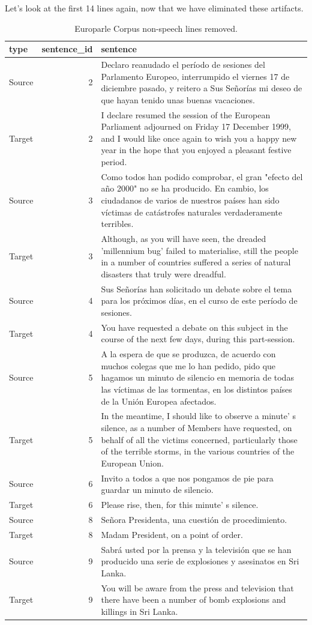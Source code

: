 \documentclass[
]{article}
\begin{document}
Let's look at the first 14 lines again, now that we have eliminated these artifacts.

\begin{table}

\caption{\label{tab:td-europarle-preview-2}Europarle Corpus non-speech lines removed.}
\centering
\begin{tabular}[t]{lrl}
\toprule
type & sentence\_id & sentence\\
\midrule
Source & 2 & Declaro reanudado el período de sesiones del Parlamento Europeo, interrumpido el viernes 17 de diciembre pasado, y reitero a Sus Señorías mi deseo de que hayan tenido unas buenas vacaciones.\\
Target & 2 & I declare resumed the session of the European Parliament adjourned on Friday 17 December 1999, and I would like once again to wish you a happy new year in the hope that you enjoyed a pleasant festive period.\\
Source & 3 & Como todos han podido comprobar, el gran "efecto del año 2000" no se ha producido. En cambio, los ciudadanos de varios de nuestros países han sido víctimas de catástrofes naturales verdaderamente terribles.\\
Target & 3 & Although, as you will have seen, the dreaded 'millennium bug' failed to materialise, still the people in a number of countries suffered a series of natural disasters that truly were dreadful.\\
Source & 4 & Sus Señorías han solicitado un debate sobre el tema para los próximos días, en el curso de este período de sesiones.\\
\addlinespace
Target & 4 & You have requested a debate on this subject in the course of the next few days, during this part-session.\\
Source & 5 & A la espera de que se produzca, de acuerdo con muchos colegas que me lo han pedido, pido que hagamos un minuto de silencio en memoria de todas las víctimas de las tormentas, en los distintos países de la Unión Europea afectados.\\
Target & 5 & In the meantime, I should like to observe a minute' s silence, as a number of Members have requested, on behalf of all the victims concerned, particularly those of the terrible storms, in the various countries of the European Union.\\
Source & 6 & Invito a todos a que nos pongamos de pie para guardar un minuto de silencio.\\
Target & 6 & Please rise, then, for this minute' s silence.\\
\addlinespace
Source & 8 & Señora Presidenta, una cuestión de procedimiento.\\
Target & 8 & Madam President, on a point of order.\\
Source & 9 & Sabrá usted por la prensa y la televisión que se han producido una serie de explosiones y asesinatos en Sri Lanka.\\
Target & 9 & You will be aware from the press and television that there have been a number of bomb explosions and killings in Sri Lanka.\\
\bottomrule
\end{tabular}
\end{table}
\end{document}
